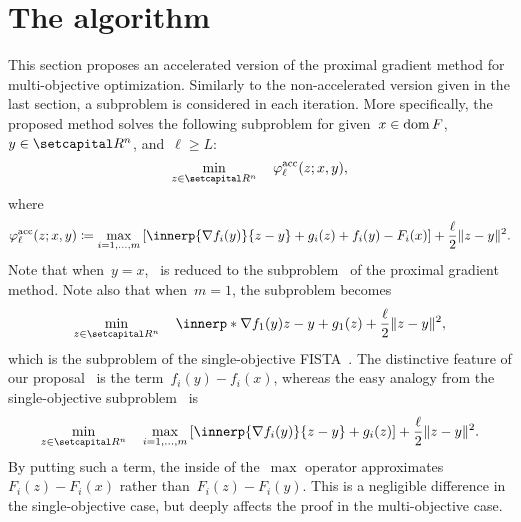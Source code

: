 \documentclass[../main]{subfiles}
\begin{document}
\section{The algorithm} 
This section proposes an accelerated version of the proximal gradient method for multi-objective optimization.
Similarly to the non-accelerated version given in the last section, a subproblem is considered in each iteration.
More specifically, the proposed method solves the following subproblem for given~$x \in \operatorname{dom} F$,~$y \in \setR^n$, and~$\ell \ge L$:
\begin{equation} \label{eq:acc prox subprob}
    \min_{z \in \setR^n} \quad \varphi^\acc_\ell(z; x, y) 
,\end{equation}
where
\begin{equation} \label{eq:varphi acc}
    \varphi^\acc_\ell(z; x, y) \coloneqq \max_{i = 1, \dots, m} \left[ \innerp{\nabla f_i(y)}{z - y} + g_i(z) + f_i(y) - F_i(x) \right] + \frac{\ell}{2} \norm{z - y}^2
.\end{equation}
Note that when~$y = x$,~ is reduced to the subproblem~ of the proximal gradient method.
Note also that when~$m = 1$, the subproblem becomes
\begin{equation} \label{eq:single}
    \min_{z \in \setR^n} \quad \innerp*{\nabla f_1(y)}{z - y} + g_1(z) + \frac{\ell}{2} \norm{z - y}^2
,\end{equation}
which is the subproblem of the single-objective FISTA~\cite{Beck2009}.
The distinctive feature of our proposal~ is the term~$f_i(y) - f_i(x)$, whereas the easy analogy from the single-objective subproblem~ is
\begin{equation}
    \min_{z \in \setR^n} \quad \max_{i = 1, \dots, m} \left[ \innerp{\nabla f_i(y)}{z - y} + g_i(z) \right] + \frac{\ell}{2} \norm{z - y}^2
.\end{equation} 
By putting such a term, the inside of the~$\max$ operator approximates~$F_i(z) - F_i(x)$ rather than~$F_i(z) - F_i(y)$.
This is a negligible difference in the single-objective case, but deeply affects the proof in the multi-objective case.
\end{document}
